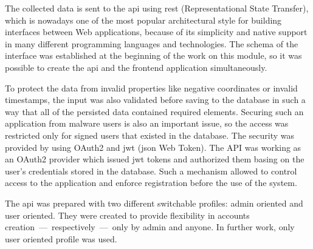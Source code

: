 The collected data is sent to the \gls{api} using \gls{rest} (Representational State Transfer), which is nowadays one of the most popular architectural style for building interfaces between Web applications, because of its simplicity and native support in many different programming languages and technologies.
The schema of the interface was established at the beginning of the work on this module, so it was possible to create the \gls{api} and the frontend application simultaneously.

To protect the data from invalid properties like negative coordinates or invalid timestamps, the input was also validated before saving to the database in such a way that all of the persisted data contained required elements.
Securing such an application from malware users is also an important issue, so the access was restricted only for signed users that existed in the database.
The security was provided by using OAuth2 and \gls{jwt} (\gls{json} Web Token).
The API was working as an OAuth2 provider which issued \gls{jwt} tokens and authorized them basing on the user's credentials stored in the database.
Such a mechanism allowed to control access to the application and enforce registration before the use of the system.

The \gls{api} was prepared with two different switchable profiles: admin oriented and user oriented.
They were created to provide flexibility in accounts creation~---~respectively~---~only by admin and anyone.
In further work, only user oriented profile was used.